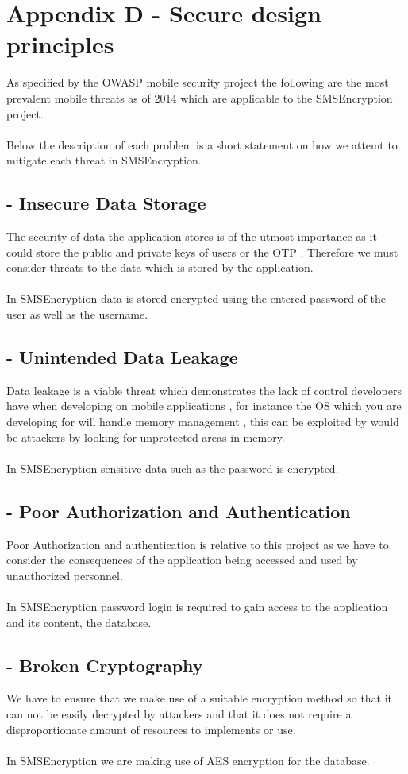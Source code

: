 \section{Appendix D - Secure design principles}
As specified by the OWASP mobile security project the following are the  most prevalent mobile threats as of 2014 which are applicable to the SMSEncryption project.\\
\textbf{\\}
Below the description of each problem is a short statement on how we attemt to mitigate each threat in SMSEncryption.
\subsection*{ - Insecure Data Storage}
The security of data the application stores is of the utmost importance as it could store the public and private keys of users or the OTP . Therefore we must consider threats to the data which is stored by the application. \\
\textbf{\\}
In SMSEncryption data is stored encrypted using the entered password of the user as well as the username.
\subsection*{ - Unintended Data Leakage}
Data leakage is a viable threat which demonstrates the lack of control developers have when developing on mobile applications , for instance the OS which you are developing for will handle memory management , this can be exploited by would be attackers by looking for unprotected areas in memory.\\
\textbf{\\}
In SMSEncryption sensitive data such as the password is encrypted.
\subsection*{ - Poor Authorization and Authentication}
Poor Authorization and authentication is relative to this project as we have to consider the consequences of the application being accessed and used by unauthorized personnel.\\
\textbf{\\}
In SMSEncryption password login is required to gain access to the application and its content, the database.
\subsection*{ - Broken Cryptography}
We have to ensure that we make use of a suitable encryption method so that it can not be easily decrypted by attackers and that it does  not require a disproportionate amount of resources to implements or use.\\
\textbf{\\}
In SMSEncryption we are making use of AES encryption for the database.
